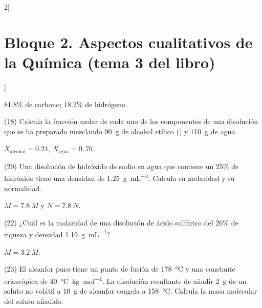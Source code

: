\documentclass[10pt]{article}
\begin{document}
\begin{multicols}{2}[
    \section{Bloque 2. Aspectos cualitativos de la Química (tema 3 del libro)}
  ]
\begin{solution}
  \num{81,8}\% de carbono; \num{18,2}\% de hidrógeno.
\end{solution}




\begin{exercise}[
    tags    = {},
    topics  = {química,química básica},
    source  = {FQ 1B MGH 2016, p77, e18},
  ]
  (18) Calcula la fracción molar de cada uno de los componentes
  de una disolución que se ha preparado mezclando \SI{90}{\gram} de alcohol etílico () y \SI{110}{\gram} de agua.
\end{exercise}

\begin{solution}
  \( X_\textrm{alcohol} = 0.24 \),
  \( X_\textrm{agua} = 0,76 \).
\end{solution}




\begin{exercise}[
    tags    = {},
    topics  = {química,química básica},
    source  = {FQ 1B MGH 2016, p77, e20},
  ]
  (20) Una disolución de hidróxido de sodio en agua que contiene un 25\% de hidróxido tiene una densidad de \SI{1.25}{\gram\per\milli\liter}. Calcula
  su molaridad y su normalidad.
\end{exercise}

\begin{solution}
  \( M = \SI{7.8}{M} \)  y  \( N = \SI{7.8}{N} \).
\end{solution}




\begin{exercise}[
    tags    = {},
    topics  = {química,química básica},
    source  = {FQ 1B MGH 2016, p77, e22},
  ]
  (22) ¿Cuál es la molaridad de una disolución de ácido sulfúrico
  del 26\% de riqueza y densidad \SI{1.19}{\gram\per\milli\liter}?
\end{exercise}

\begin{solution}
  \( M = \SI{3.2}{M} \).
\end{solution}




\begin{exercise}[
    tags    = {},
    topics  = {química,química básica},
    source  = {FQ 1B MGH 2016, p80, e23},
  ]
  (23) El alcanfor puro tiene un punto de fusión de \SI{178}{\celsius} y una constante crioscópica de \SI{40}{\celsius\kilo\gram\per\mole}. La disolución resultante de añadir \SI{2}{\gram} de un soluto no volátil a
  \SI{10}{\gram} de alcanfor congela a \SI{158}{\celsius}. Calcula la masa molecular del soluto añadido.
\end{exercise}


\end{multicols}
\end{document}
